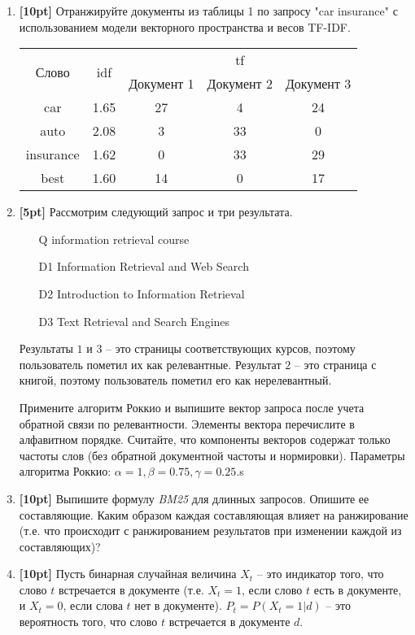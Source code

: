 \begin{enumerate}
	\item \textbf{[10pt]} Отранжируйте документы из таблицы 1 по запросу "car insurance" с 
	использованием модели векторного пространства и весов TF-IDF.
	
	\begin{tabular}{c | c | c c c}
		\multirow{2}{*}{Слово} & \multirow{2}{*}{idf} & \multicolumn{3}{c}{tf} \\ \cline{3-5}
		& & Документ 1 & Документ 2 & Документ 3 \\ \hline	
		car & 1.65 & 27 & 4 & 24 \\
		auto & 2.08 & 3 & 33 & 0 \\
		insurance & 1.62 & 0 & 33 & 29 \\
		best & 1.60 & 14 & 0 & 17 \\
	\end{tabular}
	
	\item \textbf{[5pt]} Рассмотрим следующий запрос и три результата.
	\begin{enumerate}
		\item[Q] information retrieval course
		\item[D1] Information Retrieval and Web Search
		\item[D2] Introduction to Information Retrieval
		\item[D3] Text Retrieval and Search Engines
	\end{enumerate}
	
	Результаты $1$ и $3$ – это страницы соответствующих курсов, поэтому пользователь пометил их 
	как релевантные. Результат $2$ – это страница с книгой, поэтому пользователь пометил его как 
	нерелевантный.
	
	Примените алгоритм Роккио и выпишите вектор запроса после учета обратной связи по 
	релевантности. Элементы вектора перечислите в алфавитном порядке. Считайте, что компоненты 
	векторов содержат только частоты слов (без обратной документной частоты и нормировки). 
	Параметры алгоритма Роккио: $\alpha = 1, \beta = 0.75, \gamma = 0.25.$s

	\item \textbf{[10pt]} Выпишите формулу \textit{BM25} для длинных запросов. Опишите ее 
	составляющие. Каким образом каждая составляющая влияет на ранжирование (т.е. что происходит	с 
	ранжированием результатов при изменении каждой из составляющих)?

	\item \textbf{[10pt]} Пусть бинарная случайная величина $X_t$ – это индикатор того, что слово 
	$t$	встречается в документе (т.е. $X_t = 1$, если слово $t$ есть в документе, и $X_t = 0$, 
	если слова $t$ нет в документе). $P_t = P(X_t = 1 \big| d)$ – это вероятность того, что слово 
	$t$ встречается в документе $d$. 
	

\end{enumerate}
